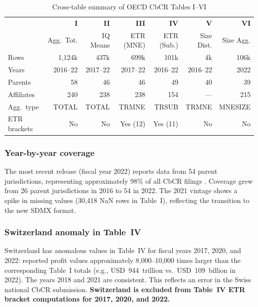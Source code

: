 \documentclass[11pt,a4paper]{article}
\begin{document}
\begin{table}[H]
\centering
\caption{Cross-table summary of OECD CbCR Tables I--VI}
\label{tab:app_crosssummary}
\footnotesize
\begin{tabular}{@{}lrrrrrr@{}}
\toprule
 & \textbf{I} & \textbf{II} & \textbf{III} & \textbf{IV} & \textbf{V} & \textbf{VI} \\
 & Agg.\ Tot. & IQ Means & ETR (MNE) & ETR (Sub.) & Size Dist. & Size Agg. \\
\midrule
Rows & 1,124k & 437k & 699k & 101k & 4k & 106k \\
Years & 2016--22 & 2017--22 & 2017--22 & 2016--22 & 2016--22 & 2022 \\
Parents & 58 & 46 & 46 & 49 & 40 & 39 \\
Affiliates & 240 & 238 & 238 & 154 & --- & 215 \\
Agg.\ type & TOTAL & TOTAL & TRMNE & TRSUB & TRMNE & MNESIZE \\
ETR brackets & No & No & Yes (12) & Yes (11) & No & No \\
\bottomrule
\end{tabular}
\end{table}

\subsubsection{Year-by-year coverage}

The most recent release (fiscal year 2022) reports data from 54 parent jurisdictions, representing approximately 98\% of all CbCR filings \citep{oecd2025corptaxstats}. Coverage grew from 26 parent jurisdictions in 2016 to 54 in 2022. The 2021 vintage shows a spike in missing values (30,418 NaN rows in Table~I), reflecting the transition to the new SDMX format.

\subsubsection{Switzerland anomaly in Table~IV}

Switzerland has anomalous values in Table~IV for fiscal years 2017, 2020, and 2022: reported profit values approximately 8,000--10,000 times larger than the corresponding Table~I totals (e.g., USD~944~trillion vs.\ USD~109~billion in 2022). The years 2018 and 2021 are consistent. This reflects an error in the Swiss national CbCR submission. \textbf{Switzerland is excluded from Table~IV ETR bracket computations for 2017, 2020, and 2022.}
\end{document}
